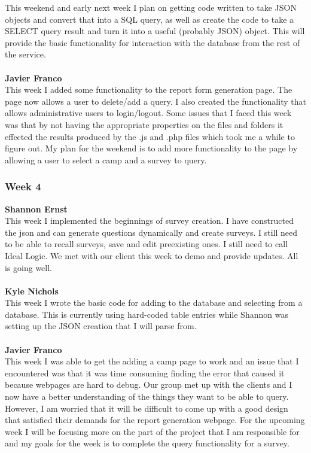 \documentclass[../final.tex]{subfiles}
\begin{document}
This weekend and early next week I plan on getting code written to take JSON objects and convert that into a SQL query, as well as create the code to take a SELECT query result and turn it into a useful (probably JSON) object. This will provide the basic functionality for interaction with the database from the rest of the service. \\ \\
\textbf{Javier Franco}\\
This week I added some functionality to the report form generation page. The page now allows a user to delete/add a query. I also created the functionality that allows administrative users to login/logout. Some issues that I faced this week was that by not having the appropriate properties on the files and folders it effected the results produced by the .js and .php files which took me a while to figure out. My plan for the weekend is to add more functionality to the page by allowing a user to select a camp and a survey to query. \\
\subsubsection{Week 4}
\textbf{Shannon Ernst}\\
This week I implemented the beginnings of survey creation. I have constructed the json and can generate questions dynamically and create surveys. I still need to be able to recall surveys, save and edit preexisting ones. I still need to call Ideal Logic. We met with our client this week to demo and provide updates. All is going well. \\ \\
\textbf{Kyle Nichols}\\
This week I wrote the basic code for adding to the database and selecting from a database. This is currently using hard-coded table entries while Shannon was setting up the JSON creation that I will parse from. \\ \\
\textbf{Javier Franco}\\
This week I was able to get the adding a camp page to work and an issue that I encountered was that it was time consuming finding the error that caused it because webpages are hard to debug. Our group met up with the clients and I now have a better understanding of the things they want to be able to query. However, I am worried that it will be difficult to come up with a good design that satisfied their demands for the report generation webpage. For the upcoming week I will be focusing more on the part of the project that I am responsible for and my goals for the week is to complete the query functionality for a survey. \\
\end{document}
